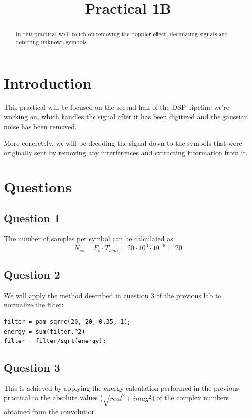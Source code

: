 \documentclass[conference,9pt]{IEEEtran}
\begin{document}
%
\title{Practical 1B}

\author{
}


\maketitle
\begin{abstract}
	In this practical we'll touch on removing the doppler effect, decimating signals and detecting unknown symbols
\end{abstract}

\section{Introduction}
This practical will be focused on the second half of the DSP pipeline we're working on, which handles the signal after it has been digitized and the gaussian noise has been removed.

More concretely, we will be decoding the signal down to the symbols that were originally sent by removing any interferences and extracting information from it.

\section{Questions}
\subsection{Question 1}
The number of samples per symbol can be calculated as:
$$N_{ss}=F_s \cdot T_{sym}=20\cdot10^6 \cdot 10^{-6} = 20$$

\subsection{Question 2}
We will apply the method described in question 3 of the previous lab to normalize the filter:

\begin{verbatim}
filter = pam_sqrrc(20, 20, 0.35, 1);
energy = sum(filter.^2)
filter = filter/sqrt(energy);
\end{verbatim}

\subsection{Question 3}
This is achieved by applying the energy calculation performed in the previous practical to the absolute values ($\sqrt{real^2+imag^2}$) of the complex numbers obtained from the convolution.
\end{document}
